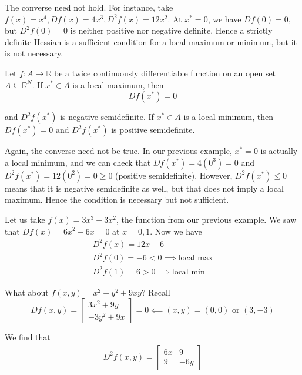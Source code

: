 \documentclass{article}
\begin{document}
\begin{remark}
  The converse need not hold. For instance, take $f(x) = x^4, Df(x) = 4x^3, D^2f(x) = 12x^2$. At $x^* = 0$, we have $Df(0) = 0$, but $D^2f(0) = 0$ is neither positive nor negative definite. Hence a strictly definite Hessian is a sufficient condition for a local maximum or minimum, but it is not necessary.
\end{remark}

\begin{theorem}
  Let $f: A \to \mathbb{R}$ be a twice continuously differentiable function on an open set $A \subseteq \mathbb{R}^N$. If $x^* \in A$ is a local maximum, then
  \[
    Df(x^*) = 0
  \]

  and $D^2f(x^*)$ is negative semidefinite. If $x^* \in A$ is a local minimum, then $Df(x^*) = 0$ and $D^2f(x^*)$ is positive semidefinite.
\end{theorem}

\begin{remark}
  Again, the converse need not be true. In our previous example, $x^* = 0$ is actually a local minimum, and we can check that $Df(x^*) = 4(0^3) = 0$ and $D^2f(x^*) = 12(0^2) = 0 \ge 0$ (positive semidefinite). However, $D^2f(x^*) \le 0$ means that it is negative semidefinite as well, but that does not imply a local maximum. Hence the condition is necessary but not sufficient.
\end{remark}

Let us take $f(x) = 3x^3 - 3x^2$, the function from our previous example. We saw that $Df(x) = 6x^2 - 6x = 0$ at $x = 0, 1$. Now we have
\begin{equation}
  \begin{array}{c}
    D^2f(x) = 12x - 6 \\
    D^2f(0) = - 6 < 0 \implies \text{local max} \\
    D^2f(1) = 6 > 0  \implies \text{local min}
  \end{array}
  \nonumber
\end{equation}

What about $f(x, y) = x^2 - y^2 + 9xy$? Recall
\[
  D f(x, y) = \left[\begin{matrix}
    3x^2 + 9y \\
    -3y^2 + 9x
  \end{matrix}\right]
  = 0
  \impliedby (x, y) = (0, 0) \text{ or } (3, -3)
\]

We find that
\begin{equation}
  \begin{array}{c}
    D^2 f(x, y) = \left[\begin{matrix}
        6x & 9 \\
        9  & -6y
    \end{matrix}\right]
  \end{array}
  \nonumber
\end{equation}
\end{document}
